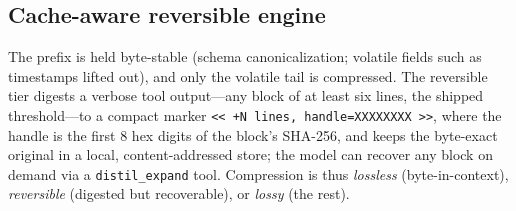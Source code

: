 \documentclass[11pt]{article}
\begin{document}
\subsection{Cache-aware reversible engine}
The prefix is held byte-stable (schema canonicalization; volatile fields such as
timestamps lifted out), and only the volatile tail is compressed. The reversible
tier digests a verbose tool output---any block of at least six lines, the shipped
threshold---to a compact marker
\verb|<< +N lines, handle=XXXXXXXX >>|, where the handle is the first 8 hex digits of
the block's SHA-256, and keeps the byte-exact original in a local, content-addressed
store; the model can recover any block on demand via a
\texttt{distil\_expand} tool. Compression is thus \emph{lossless} (byte-in-context),
\emph{reversible} (digested but recoverable), or \emph{lossy} (the rest).
\end{document}
